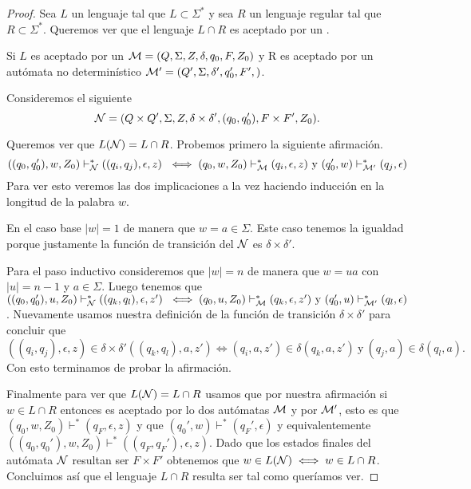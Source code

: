 \documentclass[tesis.tex]{subfiles}
\begin{document}
\begin{proof}
	Sea $L$ un lenguaje \ic tal que $L \subset \Sigma^*$ y sea $R$ un lenguaje regular tal que $R \subset \Sigma^*$. 
	Queremos ver que el lenguaje $L \cap R$ es aceptado por un \APND.
	
	Si $L$ es aceptado por un \APND ${\cal M } = (Q, \Sigma, Z, \delta, q_0, F, Z_0)$ y R es aceptado por un autómata no determinístico ${\cal M' } = (Q', \Sigma, \delta', q_0', F',)$.
	
	Consideremos el siguiente \APND
	\[
		{\cal N } = (Q \times Q', \Sigma, Z, \delta \times \delta', (q_0,q_0'), F \times F', Z_0).
	\]	
	
	Queremos ver que $L({\cal N}) = L \cap R $.	
	Probemos primero la siguiente afirmación.
	\[
	((q_0,q_0'), w, Z_0) \vdash^*_{\cal N}  ((q_i,q_j), \epsilon, z) \ \iff (q_0, w, Z_0) \vdash^*_{\cal M}  (q_i, \epsilon, z) \ \text{y} \ (q_0', w) \vdash^*_{\cal M'} (q_j, \epsilon)  	
	\]
	Para ver esto veremos las dos implicaciones a la vez haciendo inducción en la longitud de la palabra $w$.
	
	En el caso base $|w| = 1$ de manera que $w = a \in \Sigma$.
	Este caso tenemos la igualdad porque justamente la función de transición del \APND $\cal N$ es $\delta \times \delta'$.
	
	Para el paso inductivo consideremos que $|w|=n$ de manera que $w=ua$ con $|u|=n-1$ y $a \in \Sigma$.
	Luego tenemos que $((q_0,q_0'), u, Z_0) \vdash^*_{\cal N}  ((q_k,q_l), \epsilon, z') \ \iff (q_0, u, Z_0) \vdash^*_{\cal M}  (q_k, \epsilon, z') \ \text{y} \ (q_0', u) \vdash^*_{\cal M'} (q_l, \epsilon)$.
	Nuevamente usamos nuestra definición de la función de transición $\delta \times \delta'$ para concluir que
	\[ 
	((q_i,q_j),\epsilon, z) \in \delta \times \delta'((q_k,q_l), a, z') \iff  (q_i, a, z') \in \delta(q_k, a, z') \ \text{y} \ (q_j, a) \in \delta(q_l, a).
	\]	
	Con esto terminamos de probar la afirmación.
	
	Finalmente para ver que $L({\cal N})  =  L \cap R$ usamos que por nuestra afirmación si $w \in L \cap R$ entonces es aceptado por lo dos autómatas $\cal M$ y por $\cal M'$, esto es que $(q_0, w, Z_0) \vdash^* (q_F, \epsilon, z)$ y que $(q_0', w) \vdash^* (q_F', \epsilon)$ y equivalentemente $((q_0,q_0'),w,Z_0) \vdash^* ((q_F, q_F'),\epsilon, z)$. 
	Dado que los estados finales del autómata $\cal N$ resultan ser $F \times F'$ obtenemos que $w \in L({\cal N}) \iff w \in L \cap R$.
	Concluimos así que el lenguaje $L \cap R$ resulta ser \ic tal como queríamos ver.		
\end{proof}
\end{document}
